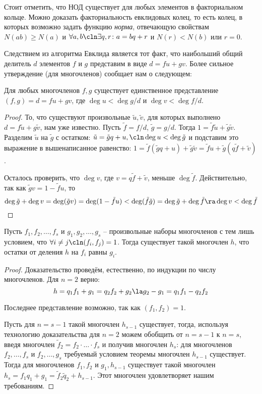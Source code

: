 Стоит отметить, что НОД существует для любых элементов в факториальном кольце. Можно доказать факториальность евклидовых колец, то есть колец, в которых возможно задать функцию \emph{норма}, отвечающую свойствам $N(ab)\ge N(a)$ и $\forall a,b\cln\exists q,r\colon a=bq+r$ и $N(r)<N(b)$ или $r=0$.

Следствием из алгоритма Евклида является тот факт, что наибольший общий делитель $d$ элементов $f$ и $g$ представим в виде $d=fu+gv$. Более сильное утверждение (для многочленов) сообщает нам о следующем:

\begin{theorem}
  Для любых многочленов $f,g$ существует единственное представление $(f,g)=d=fu+gv$, где $\deg u<\deg g/d$ и $\deg v<\deg f/d$.
\end{theorem}

\begin{proof}
То, что существуют произвольные $\tilde u,\tilde v$, для которых выполнено $d=f\tilde u+g\tilde v$, нам уже известно. Пусть $\tilde f=f/d$, $\tilde g=g/d$. Тогда $1=\tilde f\tilde u+\tilde g\tilde v$. Разделим $\tilde u$ на $\tilde g$ с остатком: $\tilde u=\tilde gq+u,\cln\deg u<\deg\tilde g$ и подставим это выражение в вышенаписанное равенство: $1=\tilde f(\tilde gq+u)+\tilde g\tilde v=\tilde fu+\tilde g(q\tilde f+\tilde v)$.

Осталось проверить, что $\deg v$, где $v=q\tilde f+\tilde v$, меньше $\deg \tilde f$. Действительно, так как $\tilde gv=1-\tilde fu$, то
$$\deg\tilde g+\deg v=\deg(\tilde gv)=\deg(1-\tilde fu)<\deg (\tilde f\tilde g)=\deg\tilde g+\deg\tilde f\ra \deg v<\deg\tilde f$$
\end{proof}

\begin{theorem}[об остатках]
  Пусть $f_1,f_2,\dots,f_s$ и $g_1,g_2,\dots,g_s$ -- произвольные наборы многочленов с тем лишь условием, что $\forall i\ne j\cln (f_i,f_j)=1$. Тогда существует такой многочлен $h$, что остатки от деления $h$ на $f_i$ равны $g_i$.
\end{theorem}
\begin{proof}
  Доказательство проведём, естественно, по индукции по числу многочленов. Для $n=2$ верно: $$h=q_1f_1+g_1=q_2f_2+g_2\la g_2-g_1=q_1f_1-q_2f_2$$

  Последнее представление возможно, так как $(f_1,f_2)=1$.

  Пусть для $n=s-1$ такой многочлен $h_{s-1}$ существует, тогда, используя технологию доказательства для $n=2$ можем обобщить от $n=s-1$ к $n=s$, введя многочлен $\tilde f_2=f_2\cdot\dots\cdot f_s$ и получив многочлен $h_s$: для многочленов $f_2,\dots, f_s$ и $f_2,\dots , g_s$ требуемый условием теоремы многочлен $h_{s-1}$ существует. Тогда для многочленов $f_1,f_2$ и $g_1, h_{s-1}$ существует такой многочлен $h_s=f_1q_1+g_1=\tilde f_2\tilde q_2+h_{s-1}$. Этот многочлен удовлетворяет нашим требованиям.
\end{proof}

